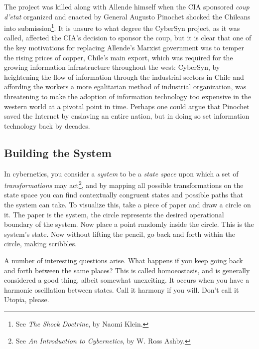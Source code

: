 The project was killed along with Allende himself when the CIA sponsored
\textit{coup d'etat} organized and enacted by General Augusto Pinochet shocked
the Chileans into submission\footnote{See \textit{The Shock Doctrine}, by Naomi
Klein.}. It is unsure to what degree the CyberSyn project, as it was called,
af\hbox{}fected the CIA's decision to sponsor the coup, but it is clear that 
one of the key motivations for replacing Allende's Marxist government was to
temper the rising prices of copper, Chile's main export, which was required for
the growing information infrastructure throughout the west: CyberSyn, by
heightening the f\hbox{}low of information through the industrial sectors in
Chile and af\hbox{}fording the workers a more egalitarian method of industrial
organization, was threatening to make the adoption of information technology 
too expensive in the western world at a pivotal point in time.  Perhaps one
could argue that Pinochet saved the Internet by enslaving an entire nation, but
in doing so set information technology back by decades.


\subsection{Building the System}
\label{s:artificial_scarcity:unspoken_mythology:building_system}

In cybernetics, you consider a \textit{system} to be a \textit{state space} 
upon which a set of \textit{transformations} may act\footnote{See \textit{An
Introduction to Cybernetics}, by W. Ross Ashby.}, and by mapping all possible
transformations on the state space you can f\hbox{}ind contextually congruent
states and possible paths that the system can take. To visualize this, take a
piece of paper and draw a circle on it. The paper is the system, the circle
represents the desired operational boundary of the system. Now place a point
randomly inside the circle. This is the system's state. Now without lifting the
pencil, go back and forth within the circle, making scribbles.

A number of interesting questions arise. What happens if you keep going back 
and forth between the same places? This is called homoeostasis, and is 
generally considered a good thing, albeit somewhat unexciting. It occurs when
you have a harmonic oscillation between states. Call it harmony if you will.
Don't call it Utopia, please.


